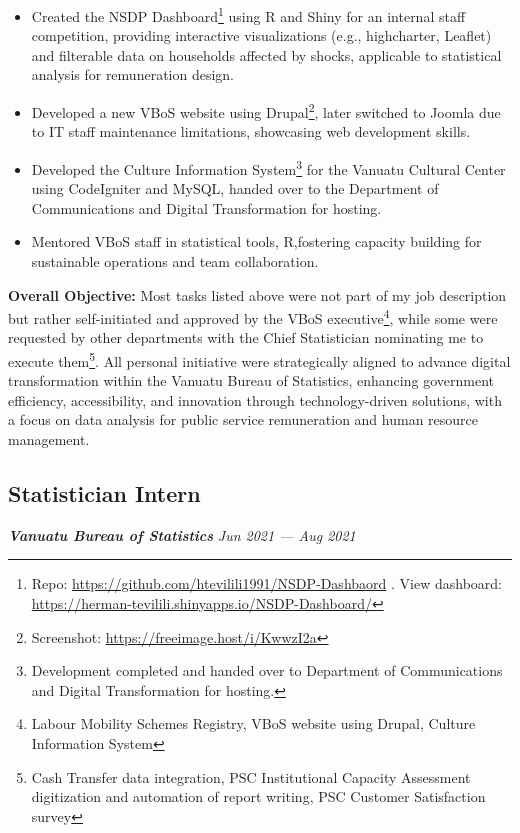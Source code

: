 \documentclass[
  letterpaper,
  DIV=11,
  numbers=noendperiod]{scrartcl}
\begin{document}
\begin{itemize}
\item
  Created the NSDP Dashboard\footnote{Repo:
    \url{https://github.com/htevilili1991/NSDP-Dashbaord} . View
    dashboard:
    \url{https://herman-tevilili.shinyapps.io/NSDP-Dashboard/}} using R
  and Shiny for an internal staff competition, providing interactive
  visualizations (e.g., highcharter, Leaflet) and filterable data on
  households affected by shocks, applicable to statistical analysis for
  remuneration design.
\item
  Developed a new VBoS website using Drupal\footnote{Screenshot:
    \url{https://freeimage.host/i/KwwzI2a}}, later switched to Joomla
  due to IT staff maintenance limitations, showcasing web development
  skills.
\item
  Developed the Culture Information System\footnote{Development
    completed and handed over to Department of Communications and
    Digital Transformation for hosting.} for the Vanuatu Cultural Center
  using CodeIgniter and MySQL, handed over to the Department of
  Communications and Digital Transformation for hosting.
\item
  Mentored VBoS staff in statistical tools, R,fostering capacity
  building for sustainable operations and team collaboration.
\end{itemize}

\textbf{Overall Objective:} Most tasks listed above were not part of my
job description but rather self-initiated and approved by the VBoS
executive\footnote{Labour Mobility Schemes Registry, VBoS website using
  Drupal, Culture Information System}, while some were requested by
other departments with the Chief Statistician nominating me to execute
them\footnote{Cash Transfer data integration, PSC Institutional Capacity
  Assessment digitization and automation of report writing, PSC Customer
  Satisfaction survey}. All personal initiative were strategically
aligned to advance digital transformation within the Vanuatu Bureau of
Statistics, enhancing government efficiency, accessibility, and
innovation through technology-driven solutions, with a focus on data
analysis for public service remuneration and human resource management.

\subsection{Statistician Intern}\label{statistician-intern}

\textbf{\emph{Vanuatu Bureau of Statistics}} {\emph{Jun 2021 --- Aug
2021}}\\
\end{document}
